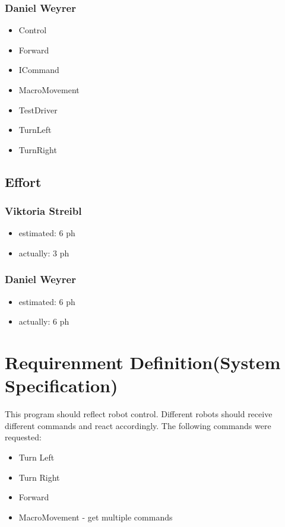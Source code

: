\subsubsection{Daniel Weyrer}
\begin{itemize}
	\item Control
	\item Forward
	\item ICommand
	\item MacroMovement
	\item TestDriver
	\item TurnLeft
	\item TurnRight
\end{itemize}

\subsection{Effort}

\subsubsection {Viktoria Streibl}
\begin{itemize}
	\item estimated: 6 ph 
	\item actually: 3 ph
\end{itemize}

\subsubsection {Daniel Weyrer}
\begin{itemize}
	\item estimated: 6 ph 
	\item actually: 6 ph
\end{itemize}

\section{Requirenment Definition(System Specification)}
This program should reflect robot control. Different robots should receive different commands and react accordingly.
The following commands were requested:
\begin{itemize}
	\item Turn Left
	\item Turn Right
	\item Forward
	\item MacroMovement - get multiple commands
\end{itemize}

